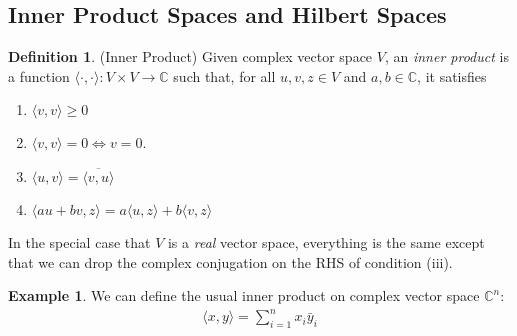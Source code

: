 \documentclass[12pt]{article}
\numberwithin{equation}{section} %
\theoremstyle{plain}
\theoremstyle{definition}
\newtheorem{defn}[thm]{Definition}
\newtheorem{ex}[thm]{Example}
\theoremstyle{remark}
\newcommand{\ra}{\rightarrow}
\newcommand{\C}{\mathbb{C}}
\newcommand{\Cn}{\mathbb{C}^n}
\begin{document}
\clearpage
\subsection{Inner Product Spaces and Hilbert Spaces}

\begin{defn}(Inner Product)
Given complex vector space $V$, an \emph{inner product} is a function
$\langle \cdot, \cdot \rangle: V\times V \ra \C$ such that, for all
$u,v,z\in V$ and $a,b\in\C$, it satisfies
\begin{enumerate}[label=(\roman*)]
  \item $\langle v,v \rangle \geq 0$
  \item $\langle v,v\rangle =0 \iff v=0$.
  \item $\langle u,v\rangle = \overline{\langle v,u\rangle}$
  \item $\langle au + bv, z\rangle
    = a\langle u, z\rangle + b\langle v, z\rangle$
\end{enumerate}
In the special case that $V$ is a \emph{real} vector space, everything
is the same except that we can drop the complex conjugation on the RHS
of condition (iii).
\end{defn}

\begin{ex}
We can define the usual inner product on complex vector space $\Cn$:
\begin{align*}
  \langle x,y\rangle = \sum_{i=1}^n x_i \bar{y}_i
\end{align*}
\end{ex}
\end{document}

